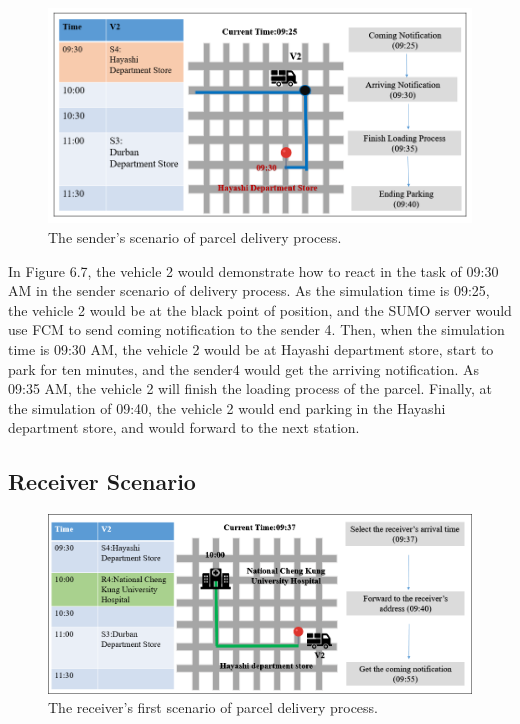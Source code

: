 \documentclass[12pt]{ksthesis}
\begin{document}
\begin{thesis}
{\begin{figure}[H]
\centering
\includegraphics[width=1.0\textwidth]{./Thesis_figures/F6-7_senderScenario.PNG}
\caption{\large The sender's scenario of parcel delivery process.}
\vspace{0.5cm}
\label{Fig:senderScenario_DeliveryPorcess}
\end{figure}

In Figure 6.7, the vehicle 2 would demonstrate how to react in the task of 09:30 AM in the sender scenario of delivery process. As the simulation time is 09:25, the vehicle 2 would be at the black point of position, and the SUMO server would use FCM to send coming notification to the sender 4. Then, when the simulation time is 09:30 AM, the vehicle 2 would be at Hayashi department store, start to park for ten minutes, and the sender4 would get the arriving notification.
As 09:35 AM, the vehicle 2 will finish the loading process of the parcel. Finally, at the simulation of 09:40, the vehicle 2 would end parking in the Hayashi department store, and would forward to the next station.

\subsection{Receiver Scenario}

\begin{figure}[t]
\centering
\includegraphics[width=1.0\textwidth]{./Thesis_figures/F6-8_receiverScenario1.PNG}
\caption{\large The receiver's first scenario of parcel delivery process.}
\vspace{0.5cm}
\label{Fig:FirsrtReceiverScenario_deliveryProcess}
\end{figure}

}
\end{thesis}
\end{document}
